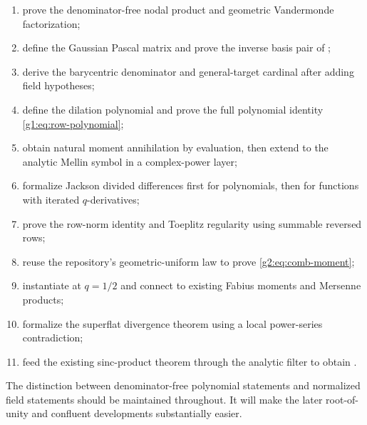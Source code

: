 \begin{enumerate}
\item prove the denominator-free nodal product and geometric Vandermonde
      factorization;
\item define the Gaussian Pascal matrix and prove the inverse basis pair of
      ;
\item derive the barycentric denominator and general-target cardinal after
      adding field hypotheses;
\item define the dilation polynomial and prove the full polynomial identity
      \eqref{g1:eq:row-polynomial};
\item obtain natural moment annihilation by evaluation, then extend to the
      analytic Mellin symbol in a complex-power layer;
\item formalize Jackson divided differences first for polynomials, then for
      functions with iterated $q$-derivatives;
\item prove the row-norm identity and Toeplitz regularity using summable
      reversed rows;
\item reuse the repository's geometric-uniform law to prove
      \eqref{g2:eq:comb-moment};
\item instantiate at $q=1/2$ and connect to existing Fabius moments and
      Mersenne products;
\item formalize the superflat divergence theorem using a local power-series
      contradiction;
\item feed the existing sinc-product theorem through the analytic filter to
      obtain .
\end{enumerate}

The distinction between denominator-free polynomial statements and normalized
field statements should be maintained throughout.  It will make the later
root-of-unity and confluent developments substantially easier.
